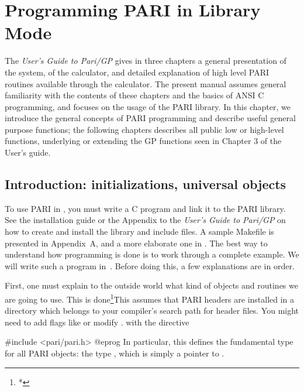 %
%
\chapter{Programming PARI in Library Mode}

\noindent The \emph{User's Guide to Pari/GP} gives in three chapters a
general presentation of the system, of the  calculator, and detailed
explanation of high level PARI routines available through the calculator. The
present manual assumes general familiarity with the contents of these
chapters and the basics of ANSI C programming, and focuses on the usage of
the PARI library. In this chapter, we introduce the general concepts of PARI
programming and describe useful general purpose functions; the following
chapters describes all public low or high-level functions, underlying or 
extending the GP functions seen in Chapter 3 of the User's guide.

\section{Introduction: initializations, universal objects}
\label{se:intro4}

\noindent
To use PARI in , you must write a C program and link it to
the PARI library. See the installation guide or the Appendix to the
\emph{User's Guide to Pari/GP} on how to create and install the library and
include files. A sample Makefile is presented in Appendix~A, and a more
elaborate one in . The best way to understand how
programming is done is to work through a complete example. We will write such
a program in~. Before doing this, a few explanations are in
order.

First, one must explain to the outside world what kind of objects and
routines we are going to use. This is done\footnote{*}{This assumes that PARI
headers are installed in a directory which belongs to your compiler's search
path for header files. You might need to add flags like
 or modify .}
with the directive

\bprog
#include <pari/pari.h>
@eprog
\noindent
In particular, this defines the fundamental type for all PARI objects: the
type , which is simply a pointer to .


